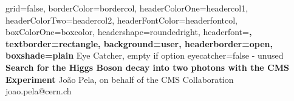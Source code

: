\documentclass[a0paper,portrait]{baposter}
\begin{document}

\background{
}

\begin{poster}{
	grid=false,
	borderColor=bordercol,
	headerColorOne=headercol1,
	headerColorTwo=headercol2,
	headerFontColor=headerfontcol,
	boxColorOne=boxcolor,
	headershape=roundedright,
	headerfont=\Large\sf\bf,
	textborder=rectangle,
	background=user,
	headerborder=open,
  boxshade=plain
}
{
	Eye Catcher, empty if option eyecatcher=false - unused
}
{\sf\bf
	Search for the Higgs Boson decay into two photons with the CMS Experiment
}
{
	\vspace{1em} João Pela, on behalf of the CMS Collaboration\\
	{\smaller joao.pela@cern.ch}
}
{
}


\end{poster}
\end{document}
